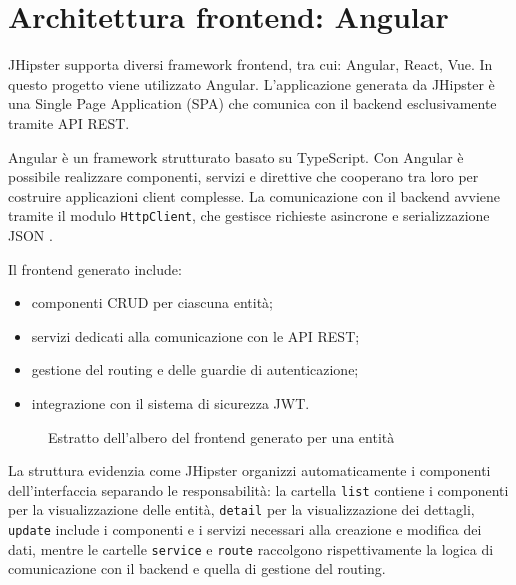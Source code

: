 \section{Architettura frontend: Angular}

JHipster supporta diversi framework frontend, tra cui: Angular, React, Vue. In questo progetto viene utilizzato Angular. L’applicazione generata da JHipster è una Single Page Application (SPA) che comunica con il backend esclusivamente tramite API REST.

Angular è un framework strutturato basato su TypeScript. Con Angular è possibile realizzare componenti, servizi e direttive che cooperano tra loro per costruire applicazioni client complesse. La comunicazione con il backend avviene tramite il modulo \texttt{HttpClient}, che gestisce richieste asincrone e serializzazione JSON \cite{AngularDocs}.

Il frontend generato include:

\begin{itemize}
	\item componenti CRUD per ciascuna entità;
	\item servizi dedicati alla comunicazione con le API REST;
	\item gestione del routing e delle guardie di autenticazione;
	\item integrazione con il sistema di sicurezza JWT.
\end{itemize}

\begin{figure}[H]
\caption{Estratto dell’albero del frontend generato per una entità}
\label{fig:entity-ts-tree}
\end{figure}

La struttura evidenzia come JHipster organizzi automaticamente i componenti dell'interfaccia separando le responsabilità: la cartella \texttt{list} contiene i componenti per la visualizzazione delle entità, \texttt{detail} per la visualizzazione dei dettagli, \texttt{update} include i componenti e i servizi necessari alla creazione e modifica dei dati, mentre le cartelle \texttt{service} e \texttt{route} raccolgono rispettivamente la logica di comunicazione con il backend e quella di gestione del routing.

